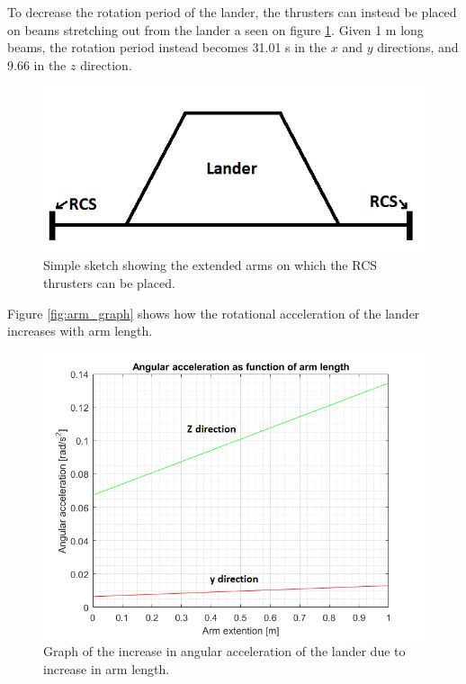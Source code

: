 To decrease the rotation period of the lander, the thrusters can instead be placed on beams stretching out from the lander a seen on figure \ref{fig:arms}. Given 1 m long beams, the rotation period instead becomes 31.01 s in the $x$ and $y$ directions, and 9.66 in the $z$ direction.

\begin{figure}[htb]
\begin{center}
\includegraphics[scale=0.8]{figures/RCS/Lunar_arms}
\caption{Simple sketch showing the extended arms on which the RCS thrusters can be placed.}
\label{fig:arms}
\end{center}
\end{figure}

Figure \ref{fig:arm_graph} shows how the rotational acceleration of the lander increases with arm length.

\begin{figure}[htb]
\begin{center}
\includegraphics[scale=0.8]{figures/RCS/arm_graph}
\caption{Graph of the increase in angular acceleration of the lander due to increase in arm length.}
\label{fig:arms_graph}
\end{center}
\end{figure}

